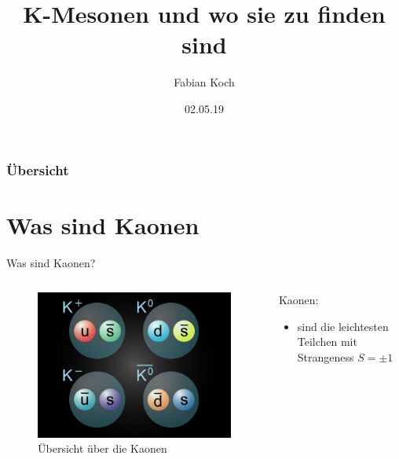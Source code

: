 \documentclass[aspectratio=1610, professionalfonts, 9pt, t]{beamer}
\title{K-Mesonen und wo sie zu finden sind}
\author[F.~Koch]{Fabian Koch}
\date{02.05.19}
\institute[Fakultät Physik ]{Fakultät Physik}
\begin{document}


\maketitle

\begin{frame}
  \frametitle{Übersicht}
  \tableofcontents
\end{frame}


\section{Was sind Kaonen}
  \begin{frame}{Was sind Kaonen?}
    \begin{columns}[onlytextwidth]
      \begin{column}{0.4\textwidth}
        \begin{figure}[ht]
          \begin{center}
            \includegraphics[height=0.6\textheight]{Images/Kaonen.png}
            \caption{Übersicht über die Kaonen\cite[7]{KOTOPress}}
          \end{center}
        \end{figure}
      \end{column}
      \begin{column}{0.5\textwidth}
        Kaonen:
        \begin{itemize}
          \item sind die leichtesten Teilchen mit Strangeness $S = \pm1$

\end{itemize}
\end{column}
\end{columns}
\end{frame}
\end{document}
